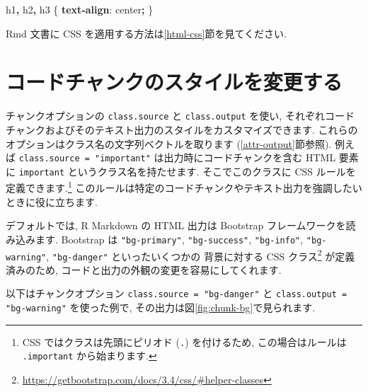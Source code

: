 \documentclass[
  11pt,
]{bxjsreport}
\newenvironment{Shaded}{\begin{snugshade}}{\end{snugshade}}
\newcommand{\DecValTok}[1]{\textcolor[rgb]{0.00,0.00,0.81}{#1}}
\newcommand{\KeywordTok}[1]{\textcolor[rgb]{0.13,0.29,0.53}{\textbf{#1}}}
\newcommand{\NormalTok}[1]{#1}
\newcommand{\OperatorTok}[1]{\textcolor[rgb]{0.81,0.36,0.00}{\textbf{#1}}}
\renewcommand{\href}[2]{#2\footnote{\url{#1}}}
\begin{document}
\begin{Shaded}
\begin{Highlighting}[]
\NormalTok{h1}\OperatorTok{,}\NormalTok{ h2}\OperatorTok{,}\NormalTok{ h3 \{}
  \KeywordTok{text{-}align}\NormalTok{: }\DecValTok{center}\OperatorTok{;}
\NormalTok{\}}
\end{Highlighting}
\end{Shaded}

Rmd 文書に CSS を適用する方法は\ref{html-css}節を見てください.

\hypertarget{chunk-styling}{%
\section{コードチャンクのスタイルを変更する}\label{chunk-styling}}

チャンクオプションの \texttt{class.source} と \texttt{class.output} を使い, それぞれコードチャンクおよびそのテキスト出力のスタイルをカスタマイズできます. これらのオプションはクラス名の文字列ベクトルを取ります (\ref{attr-output}節参照). 例えば \texttt{class.source = "important"} は出力時にコードチャンクを含む HTML 要素に \texttt{important} というクラス名を持たせます. そこでこのクラスに CSS ルールを定義できます.\footnote{CSS ではクラスは先頭にピリオド (\texttt{.}) を付けるため, この場合はルールは \texttt{.important} から始まります.} このルールは特定のコードチャンクやテキスト出力を強調したいときに役に立ちます.

デフォルトでは, R Markdown の HTML 出力は Bootstrap フレームワークを読み込みます. Bootstrap は \texttt{"bg-primary"}, \texttt{"bg-success"}, \texttt{"bg-info"}, \texttt{"bg-warning"}, \texttt{"bg-danger"} といったいくつかの \href{https://getbootstrap.com/docs/3.4/css/\#helper-classes}{背景に対する CSS クラス} が定義済みのため, コードと出力の外観の変更を容易にしてくれます.

以下はチャンクオプション \texttt{class.source = "bg-danger"} と \texttt{class.output = "bg-warning"} を使った例で, その出力は図\ref{fig:chunk-bg}で見られます.
\end{document}

